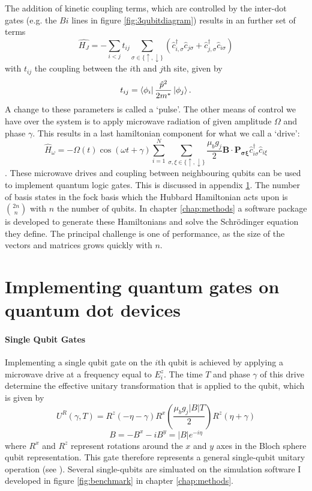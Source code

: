 \documentclass{report}
\begin{document}
\begin{appendices}
The addition of kinetic coupling terms, which are controlled by the inter-dot gates (e.g. the $Bi$ lines in figure \ref{fig:3qubitdiagram}) results in an further set of terms
\begin{equation*}
    \hat{H_J} = -\sum_{i < j}t_{ij}{\sum_{\sigma \in \{\uparrow, \downarrow\}}
    (\hat{c}_{i,\sigma}^\dag \hat{c}_{j\sigma} + \hat{c}_{j,\sigma}^\dag \hat{c}_{i\sigma})}
\end{equation*} with $t_{ij}$ the coupling between the $i$th and $j$th site, given by\begin{equation*}
    t_{ij} = \bra{\phi_i}\frac{\hat{p}^2}{2m^*}\ket{\phi_j}.
\end{equation*} A change to these parameters is called a `pulse'. The other means of control we have over the system is to apply microwave radiation of given amplitude $\Omega$ and phase $\gamma$. This results in a last hamiltonian component for what we call a `drive':
\begin{equation*}
    \hat{H}_\omega = -\Omega(t)\cos(\omega t + \gamma) \sum_{i = 1}^{N}\sum_{\sigma,\xi \in \{\uparrow, \downarrow\}}
    \frac{\mu_b g_j}{2}\mathbf{B}\cdot\mathbf{P_{\sigma\xi}}\hat{c}^\dag_{i\sigma}\hat{c}_{i\xi}
\end{equation*}.
These microwave drives and coupling between neighbouring qubits can be used to implement quantum logic gates. This is discussed in appendix \ref{appendix:gates}.
The number of basis states in the fock basis which the Hubbard Hamiltonian acts upon is $\binom{2n}{n}$ with $n$ the number of qubits. In chapter \ref{chap:methods} a software package is developed to generate these Hamiltonians and solve the Schrödinger equation they define. The principal challenge is one of performance, as the size of the vectors and matrices grows quickly with $n$.
    
\chapter{Implementing quantum gates on quantum dot devices} \label{appendix:gates}
\subsubsection{Single Qubit Gates}
Implementing a single qubit gate on the $i$th qubit is achieved by applying a microwave drive at a frequency equal to $E^z_i$. The time $T$ and phase $\gamma$ of this drive determine the effective unitary transformation that is applied to the qubit, which is given by
\begin{equation*}
    U^R(\gamma, T) = R^z(-\eta-\gamma)R^x(\frac{\mu_b g_j |B|T}{2})R^z(\eta+\gamma)
\end{equation*}
\begin{equation*}
    B = -B^x - iB^y = |B|e^{-i\eta}
\end{equation*} where $R^x$ and $R^z$ represent rotations around the $x$ and $y$ axes in the Bloch sphere qubit representation. This gate therefore represents a general single-qubit unitary operation (see \cite{Nielsen2010}). Several single-qubits are simluated on the simulation software I developed in figure \ref{fig:benchmark} in chapter \ref{chap:methods}.

\end{appendices}
\end{document}
